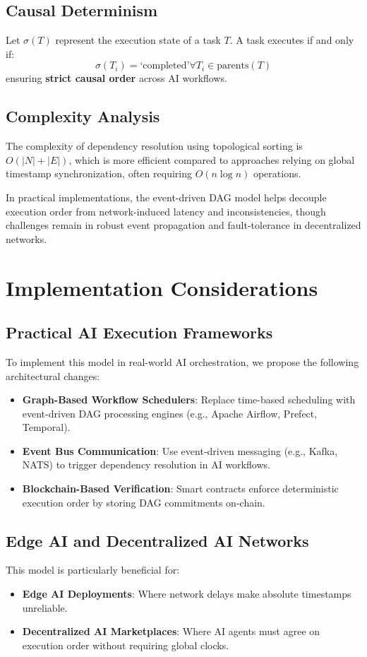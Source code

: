\documentclass{article}
\begin{document}
\subsection{Causal Determinism}
Let $\sigma(T)$ represent the execution state of a task $T$. A task executes if and only if:
\[
\sigma(T_i) = \text{‘completed’} \forall T_i \in \text{parents}(T)
\]
ensuring \textbf{strict causal order} across AI workflows.

\subsection{Complexity Analysis}
The complexity of dependency resolution using topological sorting is \(O(|N|+|E|)\), which is more efficient compared to approaches relying on global timestamp synchronization, often requiring \(O(n \log n)\) operations.

In practical implementations, the event-driven DAG model helps decouple execution order from network-induced latency and inconsistencies, though challenges remain in robust event propagation and fault-tolerance in decentralized networks.

\section{Implementation Considerations}
\subsection{Practical AI Execution Frameworks}
To implement this model in real-world AI orchestration, we propose the following architectural changes:
\begin{itemize}
    \item \textbf{Graph-Based Workflow Schedulers}: Replace time-based scheduling with event-driven DAG processing engines (e.g., Apache Airflow, Prefect, Temporal).
    \item \textbf{Event Bus Communication}: Use event-driven messaging (e.g., Kafka, NATS) to trigger dependency resolution in AI workflows.
    \item \textbf{Blockchain-Based Verification}: Smart contracts enforce deterministic execution order by storing DAG commitments on-chain.
\end{itemize}

\subsection{Edge AI and Decentralized AI Networks}
This model is particularly beneficial for:
\begin{itemize}
    \item \textbf{Edge AI Deployments}: Where network delays make absolute timestamps unreliable.
    \item \textbf{Decentralized AI Marketplaces}: Where AI agents must agree on execution order without requiring global clocks.
\end{itemize}
\end{document}
